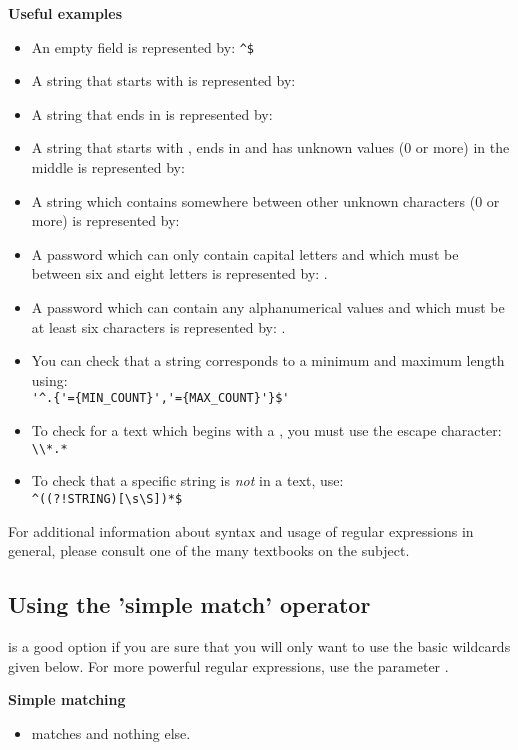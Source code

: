 \textbf{Useful examples}
\begin{itemize}
\item An empty field is represented by: \verb+^$+%
\item A string that starts with  is represented by: 
\item A string that ends in  is represented by: 
\item A string that starts with , ends in  and has unknown values (0 or more) in the middle is represented by: 
\item A string which contains  somewhere between other unknown characters (0 or more) is represented by: 
\item A password which can only contain capital letters and which must be between six and eight letters is represented by: .
\item A password which can contain any alphanumerical values and which must be at least six characters is represented by: .
\item You can check that a string corresponds to a minimum and maximum length using: \\
\verb#'^.{'={MIN_COUNT}','={MAX_COUNT}'}$'#
\item To check for a text which begins with a \bxshell{*}, you must use the escape character: \verb+\\*.*+
\item To check that a specific string is \textit{not} in a text, use:\\
 \verb+^((?!STRING)[\s\S])*$+
\end{itemize}


For additional information about syntax and usage of regular
expressions in general, please consult one
of the many textbooks on the subject.

\subsection{Using the 'simple match' operator}

 is a good option if you are sure that you will only want to use the basic wildcards given below. For more powerful regular expressions, use the  parameter .

\textbf{Simple matching}
\begin{itemize}
\item {} matches  and nothing else.
\end{itemize}

